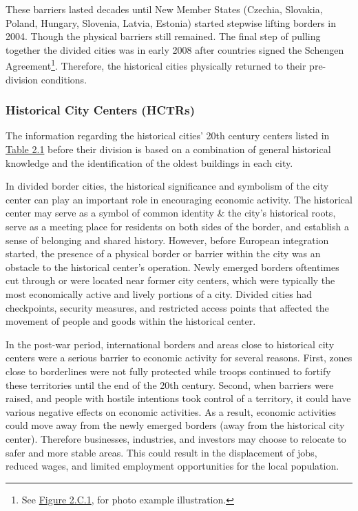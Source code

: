 \documentclass[12pt]{article}    %
\begin{document}
\par These barriers lasted decades until New Member States (Czechia, Slovakia, Poland, Hungary, Slovenia, Latvia, Estonia) started stepwise lifting borders in 2004. Though the physical barriers still remained. The final step of pulling together the divided cities was in early 2008 after countries signed the Schengen Agreement\footnote{See \hyperlink{Figure 2.C.1}{Figure 2.C.1}, for photo example illustration.}. Therefore, the historical cities physically returned to their pre-division conditions.


\subsubsection{Historical City Centers (HCTRs)}

\par The information regarding the historical cities' 20th century centers listed in \hyperlink{Table 2.1}{Table 2.1} before their division is based on a combination of general historical knowledge and the identification of the oldest buildings in each city. 

\par In divided border cities, the historical significance and symbolism of the city center can play an important role in encouraging economic activity. The historical center may serve as a symbol of common identity \& the city's historical roots, serve as a meeting place for residents on both sides of the border, and establish a sense of belonging and shared history. However, before European integration started, the presence of a physical border or barrier within the city was an obstacle to the historical center's operation. Newly emerged borders oftentimes cut through or were located near former city centers, which were typically the most economically active and lively portions of a city.  Divided cities had checkpoints, security measures, and restricted access points that affected the movement of people and goods within the historical center. 

\par In the post-war period, international borders and areas close to historical city centers were a serious barrier to economic activity for several reasons. First, zones close to borderlines were not fully protected while troops continued to fortify these territories until the end of the 20th century. Second, when barriers were raised, and people with hostile intentions took control of a territory, it could have various negative effects on economic activities.  As a result, economic activities could move away from the newly emerged borders (away from the historical city center). Therefore businesses, industries, and investors may choose to relocate to safer and more stable areas. This could result in the displacement of jobs, reduced wages, and limited employment opportunities for the local population.
\end{document}
